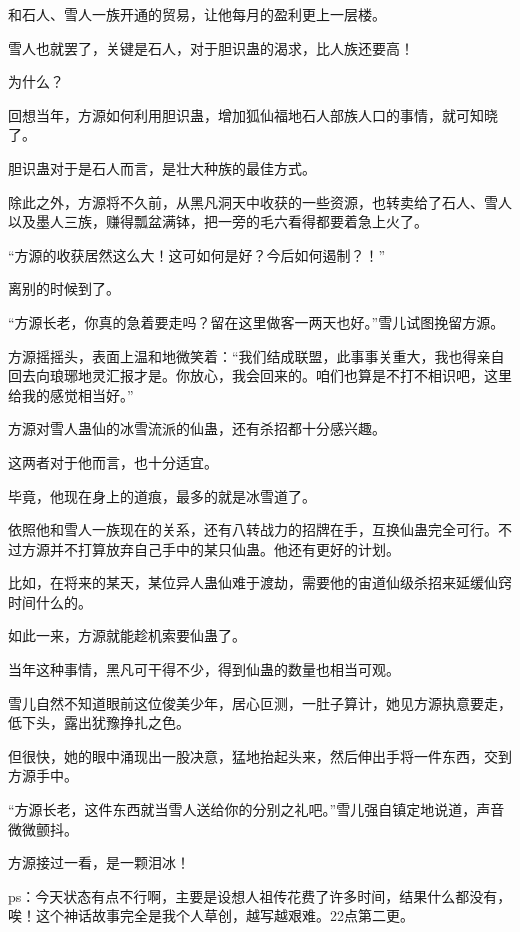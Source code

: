 \begin{this_body}
和石人、雪人一族开通的贸易，让他每月的盈利更上一层楼。

雪人也就罢了，关键是石人，对于胆识蛊的渴求，比人族还要高！

为什么？

回想当年，方源如何利用胆识蛊，增加狐仙福地石人部族人口的事情，就可知晓了。

胆识蛊对于是石人而言，是壮大种族的最佳方式。

除此之外，方源将不久前，从黑凡洞天中收获的一些资源，也转卖给了石人、雪人以及墨人三族，赚得瓢盆满钵，把一旁的毛六看得都要着急上火了。

“方源的收获居然这么大！这可如何是好？今后如何遏制？！”

离别的时候到了。

“方源长老，你真的急着要走吗？留在这里做客一两天也好。”雪儿试图挽留方源。

方源摇摇头，表面上温和地微笑着：“我们结成联盟，此事事关重大，我也得亲自回去向琅琊地灵汇报才是。你放心，我会回来的。咱们也算是不打不相识吧，这里给我的感觉相当好。”

方源对雪人蛊仙的冰雪流派的仙蛊，还有杀招都十分感兴趣。

这两者对于他而言，也十分适宜。

毕竟，他现在身上的道痕，最多的就是冰雪道了。

依照他和雪人一族现在的关系，还有八转战力的招牌在手，互换仙蛊完全可行。不过方源并不打算放弃自己手中的某只仙蛊。他还有更好的计划。

比如，在将来的某天，某位异人蛊仙难于渡劫，需要他的宙道仙级杀招来延缓仙窍时间什么的。

如此一来，方源就能趁机索要仙蛊了。

当年这种事情，黑凡可干得不少，得到仙蛊的数量也相当可观。

雪儿自然不知道眼前这位俊美少年，居心叵测，一肚子算计，她见方源执意要走，低下头，露出犹豫挣扎之色。

但很快，她的眼中涌现出一股决意，猛地抬起头来，然后伸出手将一件东西，交到方源手中。

“方源长老，这件东西就当雪人送给你的分别之礼吧。”雪儿强自镇定地说道，声音微微颤抖。

方源接过一看，是一颗泪冰！

ps：今天状态有点不行啊，主要是设想人祖传花费了许多时间，结果什么都没有，唉！这个神话故事完全是我个人草创，越写越艰难。22点第二更。

\end{this_body}

